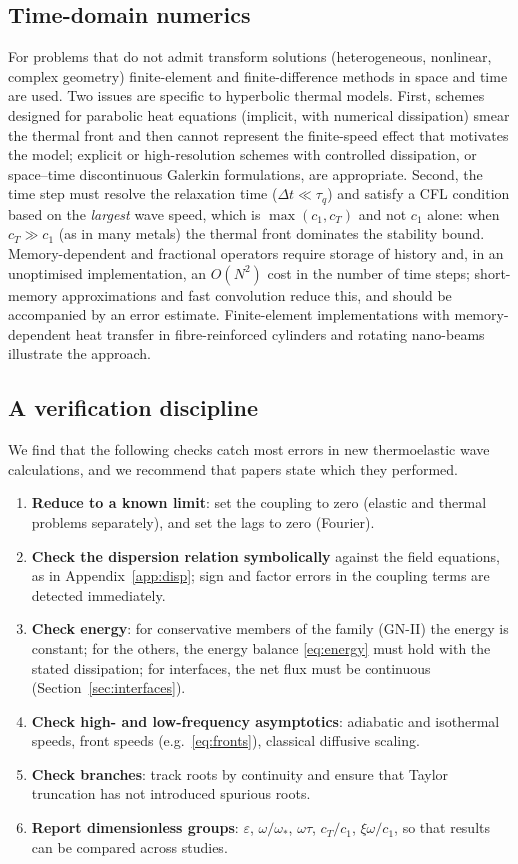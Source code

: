 \subsection{Time-domain numerics}
For problems that do not admit transform solutions (heterogeneous, nonlinear, complex geometry) finite-element and finite-difference methods in space and time are used. Two issues are specific to hyperbolic thermal models. First, schemes designed for parabolic heat equations (implicit, with numerical dissipation) smear the thermal front and then cannot represent the finite-speed effect that motivates the model; explicit or high-resolution schemes with controlled dissipation, or space--time discontinuous Galerkin formulations, are appropriate. Second, the time step must resolve the relaxation time ($\Delta t\ll\tau_q$) and satisfy a CFL condition based on the \emph{largest} wave speed, which is $\max(c_1,c_T)$ and not $c_1$ alone: when $c_T\gg c_1$ (as in many metals) the thermal front dominates the stability bound. Memory-dependent and fractional operators require storage of history and, in an unoptimised implementation, an $O(N^2)$ cost in the number of time steps; short-memory approximations and fast convolution reduce this, and should be accompanied by an error estimate. Finite-element implementations with memory-dependent heat transfer in fibre-reinforced cylinders \citep{Sur2019} and rotating nano-beams \citep{Sur2025} illustrate the approach.

\subsection{A verification discipline}
We find that the following checks catch most errors in new thermoelastic wave calculations, and we recommend that papers state which they performed.
\begin{enumerate}
\item \textbf{Reduce to a known limit}: set the coupling to zero (elastic and thermal problems separately), and set the lags to zero (Fourier).
\item \textbf{Check the dispersion relation symbolically} against the field equations, as in Appendix~\ref{app:disp}; sign and factor errors in the coupling terms are detected immediately.
\item \textbf{Check energy}: for conservative members of the family (GN-II) the energy is constant; for the others, the energy balance \eqref{eq:energy} must hold with the stated dissipation; for interfaces, the net flux must be continuous (Section~\ref{sec:interfaces}).
\item \textbf{Check high- and low-frequency asymptotics}: adiabatic and isothermal speeds, front speeds (e.g.\ \eqref{eq:fronts}), classical diffusive scaling.
\item \textbf{Check branches}: track roots by continuity and ensure that Taylor truncation has not introduced spurious roots.
\item \textbf{Report dimensionless groups}: $\varepsilon$, $\omega/\omega_*$, $\omega\tau$, $c_T/c_1$, $\xi\omega/c_1$, so that results can be compared across studies.
\end{enumerate}



